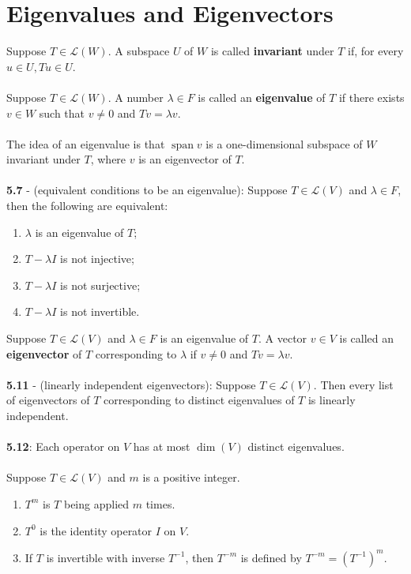 \documentclass{article}
\DeclareMathOperator{\Span}{span}
\DeclareMathOperator{\Dim}{dim}
\theoremstyle{definition}
\begin{document}
\section*{Eigenvalues and Eigenvectors}
Suppose $T \in \mathcal{L}(W)$. A subspace $U$ of $W$ is called \textbf{invariant} under $T$ if, for every $u \in U, Tu \in U$. \\ \\
Suppose $T \in \mathcal{L}(W)$. A number $\lambda \in F$ is called an \textbf{eigenvalue} of $T$ if there exists $v \in W$ such that $v \neq 0$ and $Tv = \lambda v$. \\ \\
The idea of an eigenvalue is that $\Span{v}$ is a one-dimensional subspace of $W$ invariant under $T$, where $v$ is an eigenvector of $T$. \\ \\
\textbf{5.7} - (equivalent conditions to be an eigenvalue): Suppose $T \in \mathcal{L}(V)$ and $\lambda \in F$, then the following are equivalent: \begin{enumerate}
\item $\lambda$ is an eigenvalue of $T$;
\item $T - \lambda I$ is not injective;
\item $T - \lambda I$ is not surjective;
\item $T - \lambda I$ is not invertible.
\end{enumerate} $ $ \\
Suppose $T \in \mathcal{L}(V)$ and $\lambda \in F$ is an eigenvalue of $T$. A vector $v \in V$ is called an \textbf{eigenvector} of $T$ corresponding to $\lambda$ if $v \neq 0$ and $Tv = \lambda v$. \\ \\
\textbf{5.11} - (linearly independent eigenvectors): Suppose $T \in \mathcal{L}(V)$. Then every list of eigenvectors of $T$ corresponding to distinct eigenvalues of $T$ is linearly independent. \\ \\
\textbf{5.12}: Each operator on $V$ has at most $\Dim(V)$ distinct eigenvalues. \\ \\
Suppose $T \in \mathcal{L}(V)$ and $m$ is a positive integer. \begin{enumerate}
    \item $T^m$ is $T$ being applied $m$ times.
    \item $T^0$ is the identity operator $I$ on $V$.
    \item If $T$ is invertible with inverse $T^{-1}$, then $T^{-m}$ is defined by $T^{-m} = (T^{-1})^m$.
\end{enumerate} $ $ \\
\end{document}
